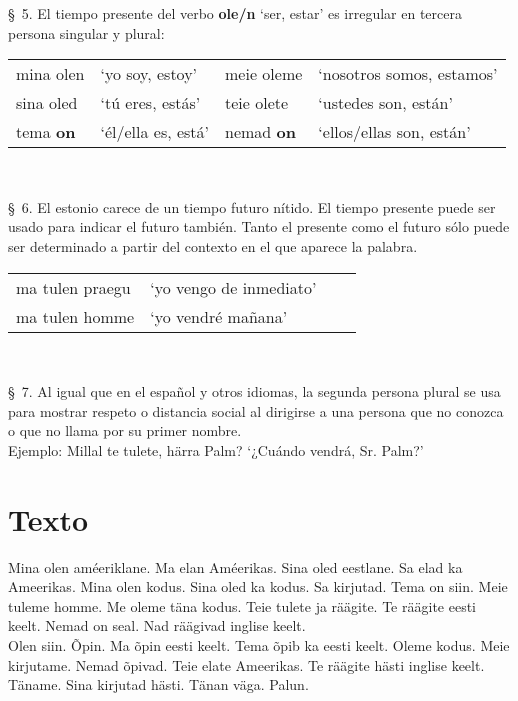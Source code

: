 \S\ 5. El tiempo presente del verbo \textbf{ole/n} `ser, estar' es irregular en tercera persona singular y plural:\\

\begin{tabular}{ l l l l }
	mina olen 			& `yo soy, estoy'		& meie oleme 				& `nosotros somos, estamos' \\
	sina oled 			& `tú eres, estás' 		& teie olete 				& `ustedes son, están' \\
	tema \textbf{on} 	& `él/ella es, está'	& nemad \textbf{on} 		& `ellos/ellas son, están'
\end{tabular}\\ \bigskip

\S\ 6. El estonio carece de un tiempo futuro nítido. El tiempo presente puede ser usado para indicar el futuro también. Tanto el presente como el futuro sólo puede ser determinado a partir del contexto en el que aparece la palabra.\\

\begin{tabular}{ l l l l }
	ma tulen praegu & `yo vengo de inmediato' \\
	ma tulen homme 	& `yo vendré mañana'
\end{tabular}\\ \bigskip

\S\ 7. Al igual que en el español y otros idiomas, la segunda persona plural se usa para mostrar respeto o distancia social al dirigirse a una persona que no conozca o que no llama por su primer nombre.\\

Ejemplo: Millal te tulete, härra Palm? `¿Cuándo vendrá, Sr. Palm?'\\

\section*{\Large{Texto}}

Mina olen améeriklane. Ma elan Améerikas. Sina oled eestlane. Sa elad ka Ameerikas. Mina olen kodus. Sina oled ka kodus. Sa kirjutad. Tema on siin. Meie tuleme homme. Me oleme täna kodus. Teie tulete ja räägite. Te räägite eesti keelt. Nemad on seal. Nad räägivad inglise keelt.\\

Olen siin. Õpin. Ma õpin eesti keelt. Tema õpib ka eesti keelt. Oleme kodus. Meie kirjutame. Nemad õpivad. Teie elate Ameerikas. Te räägite hästi inglise keelt. Täname. Sina kirjutad hästi. Tänan väga. Palun.\\

